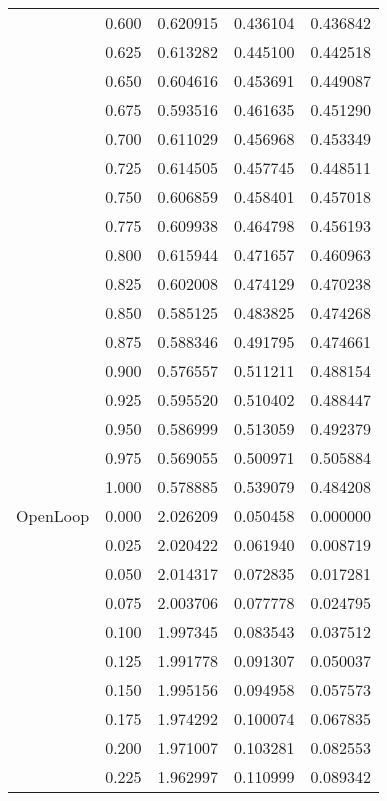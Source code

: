 \begin{tabular}{llrrr}
         & 0.600 &   0.620915 &   0.436104 &   0.436842 \\
         & 0.625 &   0.613282 &   0.445100 &   0.442518 \\
         & 0.650 &   0.604616 &   0.453691 &   0.449087 \\
         & 0.675 &   0.593516 &   0.461635 &   0.451290 \\
         & 0.700 &   0.611029 &   0.456968 &   0.453349 \\
         & 0.725 &   0.614505 &   0.457745 &   0.448511 \\
         & 0.750 &   0.606859 &   0.458401 &   0.457018 \\
         & 0.775 &   0.609938 &   0.464798 &   0.456193 \\
         & 0.800 &   0.615944 &   0.471657 &   0.460963 \\
         & 0.825 &   0.602008 &   0.474129 &   0.470238 \\
         & 0.850 &   0.585125 &   0.483825 &   0.474268 \\
         & 0.875 &   0.588346 &   0.491795 &   0.474661 \\
         & 0.900 &   0.576557 &   0.511211 &   0.488154 \\
         & 0.925 &   0.595520 &   0.510402 &   0.488447 \\
         & 0.950 &   0.586999 &   0.513059 &   0.492379 \\
         & 0.975 &   0.569055 &   0.500971 &   0.505884 \\
         & 1.000 &   0.578885 &   0.539079 &   0.484208 \\
OpenLoop & 0.000 &   2.026209 &   0.050458 &   0.000000 \\
         & 0.025 &   2.020422 &   0.061940 &   0.008719 \\
         & 0.050 &   2.014317 &   0.072835 &   0.017281 \\
         & 0.075 &   2.003706 &   0.077778 &   0.024795 \\
         & 0.100 &   1.997345 &   0.083543 &   0.037512 \\
         & 0.125 &   1.991778 &   0.091307 &   0.050037 \\
         & 0.150 &   1.995156 &   0.094958 &   0.057573 \\
         & 0.175 &   1.974292 &   0.100074 &   0.067835 \\
         & 0.200 &   1.971007 &   0.103281 &   0.082553 \\
         & 0.225 &   1.962997 &   0.110999 &   0.089342 \\

\end{tabular}
